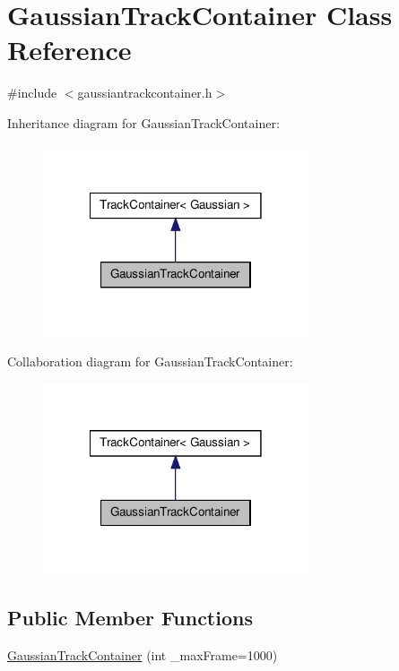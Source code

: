 \hypertarget{class_gaussian_track_container}{\section{\-Gaussian\-Track\-Container \-Class \-Reference}
\label{class_gaussian_track_container}
}


{\ttfamily \#include $<$gaussiantrackcontainer.\-h$>$}



\-Inheritance diagram for \-Gaussian\-Track\-Container\-:
\nopagebreak
\begin{figure}[H]
\begin{center}
\leavevmode
\includegraphics[width=222pt]{class_gaussian_track_container__inherit__graph}
\end{center}
\end{figure}


\-Collaboration diagram for \-Gaussian\-Track\-Container\-:
\nopagebreak
\begin{figure}[H]
\begin{center}
\leavevmode
\includegraphics[width=222pt]{class_gaussian_track_container__coll__graph}
\end{center}
\end{figure}
\subsection*{\-Public \-Member \-Functions}
\begin{DoxyCompactItemize}
\item 
\hyperlink{class_gaussian_track_container_ae4ea80c9acddbd13d1122f187c5c2e2b}{\-Gaussian\-Track\-Container} (int \-\_\-max\-Frame=1000)
\end{DoxyCompactItemize}


